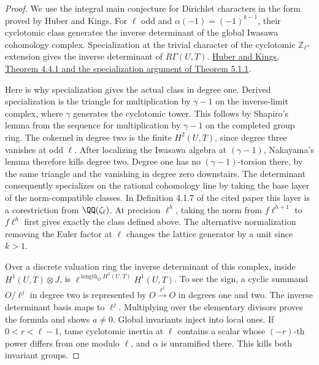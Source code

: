 \documentclass[a4paper,11pt]{article}
\theoremstyle{definition}
\theoremstyle{remark}
\newcommand{\ZZ}{\mathbb Z}\newcommand{\ord}{\operatorname{ord}}
\numberwithin{equation}{section}
\begin{document}
\begin{proof}
We use the integral main conjecture for Dirichlet characters in
the form proved by Huber and Kings. For \(\ell\) odd and
\(\alpha(-1)=(-1)^{k-1}\), their cyclotomic class generates
the inverse determinant of the global Iwasawa cohomology
complex. Specialization at the trivial character of the
cyclotomic \(\ZZ_\ell\)-extension gives the inverse determinant
of \(R\Gamma(U,T)\).
\href{https://arxiv.org/pdf/math/0101071\#page=36}{Huber and Kings,
Theorem 4.4.1 and the specialization argument of Theorem 5.1.1}.

Here is why specialization gives the actual class in degree
one. Derived specialization is the triangle for multiplication
by \(\gamma-1\) on the inverse-limit complex, where \(\gamma\)
generates the cyclotomic tower. This follows by Shapiro's lemma
from the sequence for multiplication by \(\gamma-1\) on the
completed group ring. The cokernel in degree two is the finite
\(H^2(U,T)\), since degree three vanishes at odd \(\ell\).
After localizing the Iwasawa algebra at \((\gamma-1)\),
Nakayama's lemma therefore kills degree two. Degree one has
no \((\gamma-1)\)-torsion there, by the same triangle and the
vanishing in degree zero downstairs. The determinant consequently
specializes on the rational cohomology line by taking the base
layer of the norm-compatible classes. In Definition 4.1.7 of
the cited paper this layer is a corestriction from \(\QQ(\zeta_\ell)\).
At precision \(\ell^h\), taking the norm from \(f\ell^{h+1}\)
to \(f\ell^h\) first gives exactly the class defined above.
The alternative normalization removing the Euler factor at
\(\ell\) changes the lattice generator by a unit since \(k>1\).

Over a discrete valuation ring the inverse determinant of
this complex, inside \(H^1(U,T)\otimes J\), is
\(\ell^{\operatorname{length}_O H^2(U,T)}H^1(U,T)\).
To see the sign, a cyclic summand \(O/\ell^j\) in degree two
is represented by \(O\xrightarrow{\ell^j}O\) in degrees one
and two. The inverse determinant basis maps to \(\ell^j\).
Multiplying over the elementary divisors proves the formula
and shows \(a\ne0\). Global invariants inject into local ones.
If \(0<r<\ell-1\), tame cyclotomic inertia at \(\ell\) contains
a scalar whose \((-r)\)-th power differs from one modulo \(\ell\),
and \(\alpha\) is unramified there. This kills both invariant
groups.
\end{proof}
\end{document}
